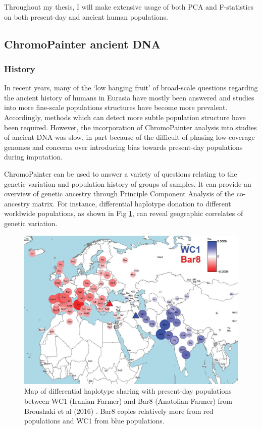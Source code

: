 Throughout my thesis, I will make extensive usage of both PCA and F-statistics on both present-day and ancient human populations.


\subsection{ChromoPainter ancient DNA}

\subsubsection{History}

In recent years, many of the `low hanging fruit' of broad-scale questions regarding the ancient history of humans in Eurasia have mostly been answered and studies into more fine-scale populations structures have become more prevalent. Accordingly, methods which can detect more subtle population structure have been required. However, the incorporation of ChromoPainter analysis into studies of ancient DNA was slow, in part because of the difficult of phasing low-coverage genomes and concerns over introducing bias towards present-day populations during imputation. 

ChromoPainter can be used to answer a variety of questions relating to the genetic variation and population history of groups of samples. It can provide an overview of genetic ancestry through Principle Component Analysis of the co-ancestry matrix. For instance, differential haplotype donation to different worldwide populations, as shown in Fig \ref{fig:broushaki_haplotype_sharing}, can reveal geographic correlates of genetic variation. 

\begin{figure}[htp]
    \centering
    \includegraphics[width=1.0\textwidth]{../images/introduction/broushaki_haplotype_sharing.jpg}
    \caption{Map of differential haplotype sharing with present-day populations between WC1 (Iranian Farmer) and Bar8 (Anatolian Farmer) from Broushaki et al (2016) \cite{Broushaki2016a}. Bar8 copies relatively more from red populations and WC1 from blue populations.}
    \label{fig:broushaki_haplotype_sharing}
\end{figure}



